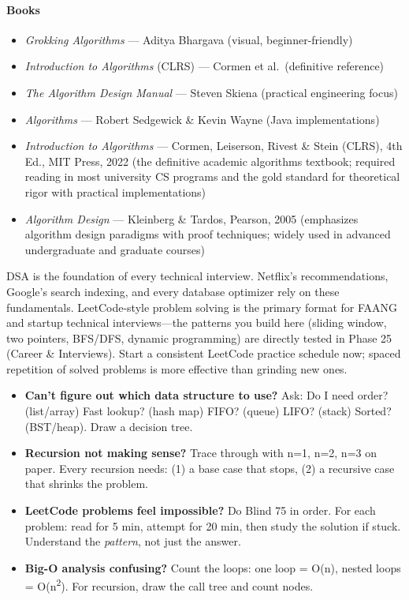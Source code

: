 \documentclass[11pt, a4paper, oneside]{report}
\begin{document}
\paragraph{Books}
\begin{itemize}[leftmargin=*]
\item \emph{Grokking Algorithms} --- Aditya Bhargava (visual, beginner-friendly)
\item \emph{Introduction to Algorithms} (CLRS) --- Cormen et al.\ (definitive reference)
\item \emph{The Algorithm Design Manual} --- Steven Skiena (practical engineering focus)
\item \emph{Algorithms} --- Robert Sedgewick \& Kevin Wayne (Java implementations)

\item \emph{Introduction to Algorithms} --- Cormen, Leiserson, Rivest \& Stein (CLRS), 4th Ed., MIT Press, 2022 (the definitive academic algorithms textbook; required reading in most university CS programs and the gold standard for theoretical rigor with practical implementations)
\item \emph{Algorithm Design} --- Kleinberg \& Tardos, Pearson, 2005 (emphasizes algorithm design paradigms with proof techniques; widely used in advanced undergraduate and graduate courses)
\end{itemize}


\begin{realworldbox}
DSA is the foundation of every technical interview. Netflix's recommendations, Google's search indexing, and every database optimizer rely on these fundamentals. LeetCode-style problem solving is the primary format for FAANG and startup technical interviews---the patterns you build here (sliding window, two pointers, BFS/DFS, dynamic programming) are directly tested in Phase 25 (Career \& Interviews). Start a consistent LeetCode practice schedule now; spaced repetition of solved problems is more effective than grinding new ones.
\end{realworldbox}


\begin{stuckbox}
\begin{itemize}[leftmargin=*]
\item \textbf{Can't figure out which data structure to use?} Ask: Do I need order? (list/array) Fast lookup? (hash map) FIFO? (queue) LIFO? (stack) Sorted? (BST/heap). Draw a decision tree.
\item \textbf{Recursion not making sense?} Trace through with n=1, n=2, n=3 on paper. Every recursion needs: (1) a base case that stops, (2) a recursive case that shrinks the problem.
\item \textbf{LeetCode problems feel impossible?} Do Blind 75 in order. For each problem: read for 5 min, attempt for 20 min, then study the solution if stuck. Understand the \emph{pattern}, not just the answer.
\item \textbf{Big-O analysis confusing?} Count the loops: one loop = O(n), nested loops = O(n\textsuperscript{2}). For recursion, draw the call tree and count nodes.
\end{itemize}
\end{stuckbox}
\end{document}
